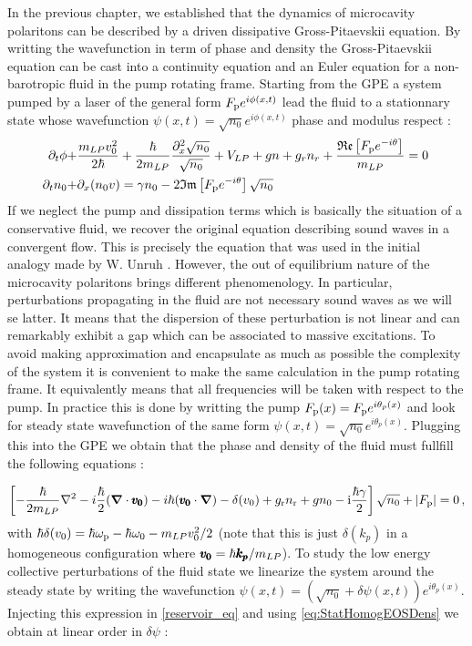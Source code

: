 In the previous chapter, we established that the dynamics of microcavity polaritons can be described by a driven dissipative Gross-Pitaevskii equation.
By writting the wavefunction in term of phase and density the Gross-Pitaevskii equation can be cast into a continuity equation and an Euler equation for a non-barotropic fluid in the pump rotating frame. Starting from the GPE
a system pumped by a laser of the general form $F_{\mathrm{p}}e^{i\phi(x,t)}$ lead the fluid to a stationnary state whose wavefunction $\psi(x,t)=\sqrt{n_0}e^{i\phi(x,t)}$ phase and modulus respect :
\begin{equation}
    \begin{align}
    \partial_t \phi +& \frac{m_{LP} v_0^2}{2\hbar}+\frac{\hbar}{2m_{LP}}\frac{\partial_x^2\sqrt{n_0}}{\sqrt{n_0}}+V_{LP}+gn+g_rn_r+\frac{\mathfrak{Re}\left[F_{\mathrm{p}}e^{-i\theta}\right]}{m_{LP}}=0\,\\
    \partial_t n_0 +& \partial_x(n_0v)= \gamma n_0 -2\mathfrak{Im}\left[F_{\mathrm{p}}e^{-i\theta}\right]\sqrt{n_0}
    \end{align}
    \label{eq:continuity}
\end{equation}
If we neglect the pump and dissipation terms which is basically the situation of a conservative fluid, we recover the original equation describing 
sound waves in a convergent flow. This is precisely the equation that was used in the initial analogy made by W. Unruh \cite{unruh_experimental_1981}.
However, the out of equilibrium nature of the microcavity polaritons brings different phenomenology. In particular, perturbations propagating in
the fluid are not necessary sound waves as we will se latter. It means that the dispersion of these perturbation is not linear and 
can remarkably exhibit a gap which can be associated to massive excitations. To avoid making approximation and encapsulate as much as possible 
the complexity of the system it is convenient to make the same calculation in the pump rotating frame. It equivalently means that all frequencies
will be taken with respect to the pump. In practice this is done by writting the pump $F_{\mathrm{p}}(x)= F_{\mathrm{p}}e^{i\theta_p(x)}$ and look for steady state wavefunction 
of the same form $\psi(x,t)=\sqrt{n_0}e^{i\theta_p(x)}$. Plugging this into the GPE we obtain that the phase and density of the fluid must fullfill the following equations :

\begin{equation}
    \left[-\frac{\hbar}{2m_{LP}}\nabla^2-i\frac{\hbar}{2}(\boldsymbol{\nabla}\cdot\pmb{v_0}) -i\hbar(\pmb{v_0}\cdot\boldsymbol{\nabla})- \delta(v_0)+g_{\rm r}n_{\rm r}+g n_0-\mathrm{i}\frac{\hbar\gamma}{2}\right]\sqrt{n_0}+|F_{\mathrm{p}}|=0\,,
        \label{eq:StatHomogEOSDens}
\end{equation}
with $\hbar \delta(v_0)=\hbar\omega_{\mathrm{p}}-\hbar\omega_0-m_{LP} v_0^2/2$ (note that this is just $\delta(k_p)$ in a homogeneous configuration where $\pmb{v_0}=\hbar\pmb{k_p}/m_{LP}$).
To study the low energy collective perturbations of the fluid state we linearize the system around the steady state by writing the wavefunction
$\psi(x,t)=(\sqrt{n_0}+\delta\psi(x,t))e^{i\theta_p(x)}$. Injecting this expression in \autoref{reservoir_eq} and using \autoref{eq:StatHomogEOSDens} we obtain at linear order in $\delta\psi$ :

